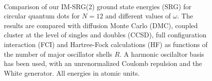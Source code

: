 \begin{figure}
  \centering
   \\
  \caption{Comparison of our IM-SRG(2) ground state energies (SRG) for circular quantum dots for $N=12$ and different values of $\omega$. The results are compared with diffusion Monte Carlo (DMC), coupled cluster at the level of singles and doubles (CCSD), full configuration interaction (FCI) and Hartree-Fock calculations (HF) as functions of the number of major oscillator shells $R$. A harmonic oscilaltor basis has been used, with an unrenormalized Coulomb repulsion and the White generator. All energies in atomic units.}
  \label{fig:N12}
\end{figure}

